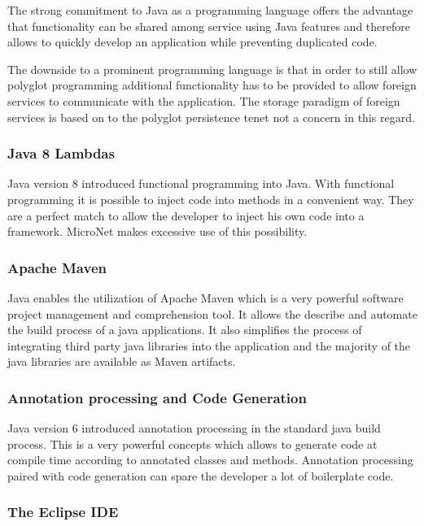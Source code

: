 The strong commitment to Java as a programming language offers the
advantage that functionality can be shared among service using Java features
and therefore allows to quickly develop an application while preventing
duplicated code.

The downside to a prominent programming language is that in order to still allow
polyglot programming additional functionality has to be provided to allow
foreign services to communicate with the application. The storage paradigm of
foreign services is based on to the polyglot persistence tenet not a concern in
this regard.

\subsubsection{Java 8 Lambdas}

Java version 8 introduced functional programming into Java. With
functional programming it is possible to inject code into methods in a
convenient way. They are a perfect match to allow the developer to inject his
own code into a framework. MicroNet makes excessive use of this possibility.

\subsubsection{Apache Maven}

Java enables the utilization of Apache Maven which is a very powerful software
project management and comprehension tool. It allows the describe and automate
the build process of a java applications. It also simplifies the process of
integrating third party java libraries into the application and the majority of
the java libraries are available as Maven artifacts.

\subsubsection{Annotation processing and Code Generation}

Java version 6 introduced annotation processing in the standard java build
process. This is a very powerful concepts which allows to generate code at
compile time according to annotated classes and methods. Annotation processing
paired with code generation can spare the developer a lot of boilerplate code.

\subsubsection{The Eclipse IDE}

